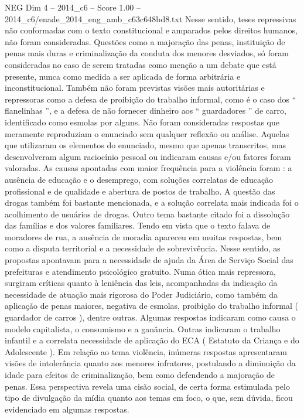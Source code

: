 \begin{textsample}{NEG Dim 4 – 2014\_c6 – Score 1.00 – 2014\_c6/enade\_2014\_eng\_amb\_c63c648bd8.txt}
Nesse sentido, teses repressivas não conformadas com o texto constitucional e amparados pelos direitos humanos, não foram consideradas.
Questões como a majoração das penas, instituição de penas mais duras e criminalização da conduta dos menores desviados, só foram consideradas no caso de serem tratadas como menção a um debate que está presente, nunca como medida a ser aplicada de forma arbitrária e inconstitucional.
Também não foram previstas visões mais autoritárias e repressoras como a defesa de proibição do trabalho informal, como é o caso dos “ flanelinhas ”, e a defesa de não fornecer dinheiro aos “ guardadores ” de carro, identificado como esmolas por alguns.
Não foram consideradas respostas que meramente reproduziam o enunciado sem qualquer reflexão ou análise.
Aquelas que utilizaram os elementos do enunciado, mesmo que apenas transcritos, mas desenvolveram algum raciocínio pessoal ou indicaram causas e/ou fatores foram valoradas.
As causas apontadas com maior frequência para a violência foram : a ausência de educação e o desemprego, com soluções correlatas de educação profissional e de qualidade e abertura de postos de trabalho.
A questão das drogas também foi bastante mencionada, e a solução correlata mais indicada foi o acolhimento de usuários de drogas.
Outro tema bastante citado foi a dissolução das famílias e dos valores familiares.
Tendo em vista que o texto falava de moradores de rua, a ausência de moradia apareceu em muitas respostas, bem como a disputa territorial e a necessidade de sobrevivência.
Nesse sentido, as propostas apontavam para a necessidade de ajuda da Área de Serviço Social das prefeituras e atendimento psicológico gratuito.
Numa ótica mais repressora, surgiram críticas quanto à leniência das leis, acompanhadas da indicação da necessidade de atuação mais rigorosa do Poder Judiciário, como também da aplicação de penas maiores, negativa de esmolas, proibição do trabalho informal ( guardador de carros ), dentre outras.
Algumas respostas indicaram como causa o modelo capitalista, o consumismo e a ganância.
Outras indicaram o trabalho infantil e a correlata necessidade de aplicação do ECA ( Estatuto da Criança e do Adolescente ).
Em relação ao tema violência, inúmeras respostas apresentaram visões de intolerância quanto aos menores infratores, postulando a diminuição da idade para efeitos de criminalização, bem como defendendo a majoração de penas.
Essa perspectiva revela uma cisão social, de certa forma estimulada pelo tipo de divulgação da mídia quanto aos temas em foco, o que, sem dúvida, ficou evidenciado em algumas respostas.

\end{textsample}
